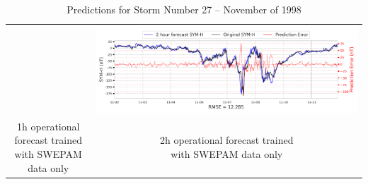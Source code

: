 \documentclass[draft,sw]{agutexSI2019}
\begin{document}
\begin{table}
\begin{tabular}{cc}
&
\includegraphics[width=0.49\linewidth]{paper_plots_shade/2h_swepam_rt/2h_swepam_rt_storm_27.png}
\\
\shortstack{1h operational forecast trained\\ with SWEPAM data only} & \shortstack{2h operational forecast trained\\ with SWEPAM data only}
\vspace*{12pt}
\\
\end{tabular}
\caption{Predictions for Storm Number 27 -- November of 1998}
\label{storm-27}
\end{table}
\end{document}
